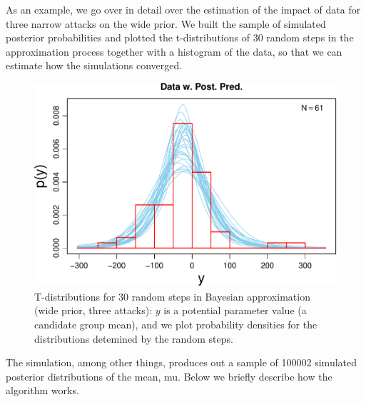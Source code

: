 \documentclass[10pt,]{scrartcl}
\begin{document}
\normalsize

As an example, we go over in detail over the estimation of the impact of
data for three narrow attacks on the wide prior. We built the sample of
simulated posterior probabilities and plotted the t-distributions of 30
random steps in the approximation process together with a histogram of
the data, so that we can estimate how the simulations converged.

\footnotesize

\normalsize

\begin{figure}

\begin{center}\includegraphics[width=1\linewidth]{redditAnalysisWalkthrough_files/figure-latex/unnamed-chunk-48-1} \end{center}
\label{fig:threeWidePostPred}
\caption{T-distributions for 30 random steps in Bayesian approximation (wide prior, three attacks): $y$ is a potential parameter value (a candidate group mean), and we plot probability densities for the distributions detemined by the random steps.}
\end{figure}

The simulation, among other things, produces out a sample of 100002
simulated posterior distributions of the mean, \textsf{mu}. Below we
briefly describe how the algorithm works.\\
\end{document}
